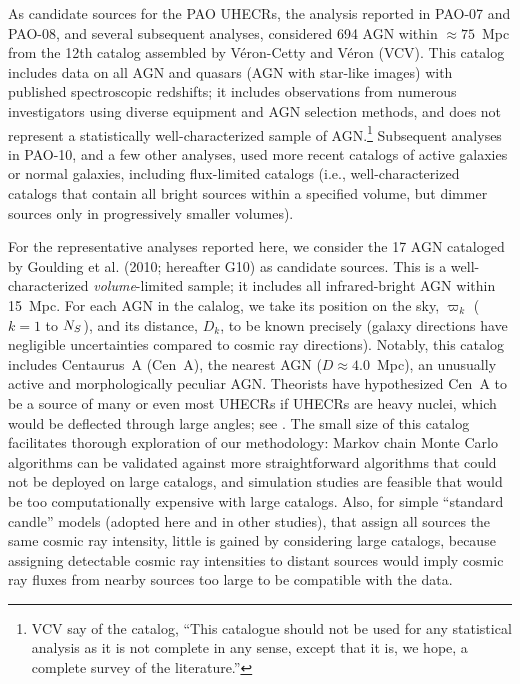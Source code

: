 As candidate sources for the PAO UHECRs, the analysis reported in PAO-07 and
PAO-08, and several subsequent analyses, considered 694 
AGN within $\approx 75$~Mpc from the 12th catalog 
assembled by V\'eron-Cetty and V\'eron \cite{VCV-12thAGNCat} (VCV). 
This catalog includes data on all AGN and quasars (AGN with star-like
images) with published spectroscopic redshifts; it includes observations
from numerous investigators using diverse equipment and AGN selection
methods, and does not represent a statistically well-characterized sample of
AGN.\footnote{VCV say of the catalog, ``This catalogue should not be used
for any statistical analysis as it is not complete in any sense, except that
it is, we hope, a complete survey of the literature.''}
Subsequent analyses in PAO-10, and a few other analyses, used more recent
catalogs of active galaxies or normal galaxies, including flux-limited
catalogs (i.e., well-characterized catalogs that contain all bright sources
within a specified volume, but dimmer sources only in progressively smaller
volumes).


For the representative analyses reported here, we consider the 17 AGN
cataloged by Goulding et al.\cite{2010MNRAS.406..597G} (2010; hereafter G10)
as candidate sources.  This is a well-characterized {\em volume}-limited
sample; it includes all infrared-bright AGN within 15~Mpc.  
For each AGN in the calalog, we take its position on the sky, $\varpi_k$
($k=1$ to $N_S$), and its distance, $D_k$, to be known precisely (galaxy
directions have negligible uncertainties compared to cosmic ray directions).
Notably, this catalog includes Centaurus~A (Cen~A), the nearest AGN
($D\approx 4.0$~Mpc), an unusually active and morphologically peculiar AGN.
Theorists have hypothesized Cen~A to be a source of many or even most UHECRs
if UHECRs are heavy nuclei, which would be deflected through large angles;
see \cite{B+09-CenA,GBdS10-CenA,BdS12-CenA}.  The small size of this catalog
facilitates thorough exploration of our methodology: Markov chain Monte
Carlo algorithms can be validated against more straightforward algorithms
that could not be deployed on large catalogs, and simulation studies are
feasible that would be too computationally expensive with large catalogs.
Also, for simple ``standard candle'' models (adopted here and in other
studies), that assign all sources the same cosmic ray intensity, little is
gained by considering large catalogs, because assigning detectable cosmic
ray intensities to distant sources would imply cosmic ray fluxes from nearby
sources too large to be compatible with the data.

